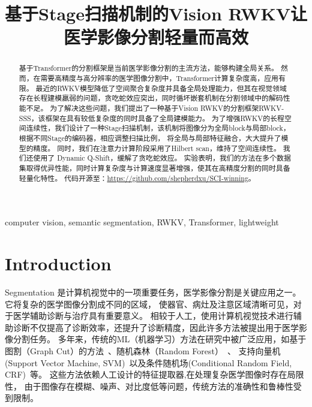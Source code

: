 \documentclass[conference]{IEEEtran}   %
\begin{document}
\title{基于Stage扫描机制的Vision RWKV让医学影像分割轻量而高效}

\author{
}

\maketitle

\begin{abstract}
基于Transformer的分割框架是当前医学影像分割的主流方法，能够构建全局关系。
然而，在需要高精度与高分辨率的医学图像分割中，Transformer计算复杂度高，应用有限。
最近的RWKV模型降低了空间聚合复杂度并具备全局处理能力，但其在视觉领域存在长程建模羸弱的问题，贪吃蛇效应突出，同时循坏嵌套机制在分割领域中的解码性能不足。
为了解决这些问题，我们提出了一种基于Vision RWKV的分割框架RWKV-SSS，该框架在具有较低复杂度的同时具备了全局建模能力。
为了增强RWKV的长程空间连续性，我们设计了一种Stage扫描机制，该机制将图像分为全局block与局部block，根据不同Stage的编码器，相应调整扫描比例，
将全局与局部特征融合，大大提升了模型的精度。
同时，我们在注意力计算阶段采用了Hilbert scan，维持了空间连续性。
我们还使用了 Dynamic Q-Shift，缓解了贪吃蛇效应。
实验表明，我们的方法在多个数据集取得优异性能，同时计算复杂度与计算速度显著增强，使其在高精度分割的同时具备轻量化特性。
代码开源至：\url{https://github.com/shepherdxu/SCI-winning}。
\end{abstract}

\begin{IEEEkeywords}
computer vision, semantic segmentation, RWKV, Transformer, lightweight
\end{IEEEkeywords}

\section{Introduction}
 Segmentation 是计算机视觉中的一项重要任务，医学影像分割是关键应用之一。它将复杂的医学图像分割成不同的区域，
使器官、病灶及注意区域清晰可见，对于医学辅助诊断与治疗具有重要意义。
相较于人工，使用计算机视觉技术进行辅助诊断不仅提高了诊断效率，还提升了诊断精度，因此许多方法被提出用于医学影像分割任务。
多年来，传统的ML（机器学习）方法在研究中被广泛应用，如基于图割（Graph Cut）的方法~\cite{Graph Cut}、随机森林（Random Forest）~\cite{Random Forest}、
支持向量机(Support Vector Machine, SVM)~\cite{SVM}以及条件随机场(Conditional Random Field, CRF)~\cite{Conditional Random Field}等。
这些方法依赖人工设计的特征提取器,在处理复杂医学图像时存在局限性，
由于图像存在模糊、噪声、对比度低等问题，传统方法的准确性和鲁棒性受到限制。
\end{document}
